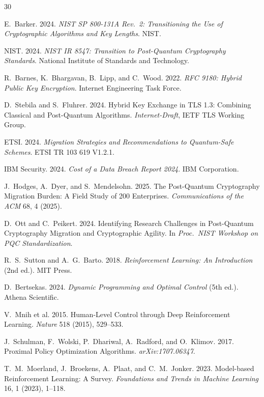 \documentclass[sigconf,nonacm]{acmart}
\begin{document}
\sloppy

\begin{thebibliography}{30}

E.~Barker. 2024. \textit{NIST SP 800-131A Rev.\ 2: Transitioning the
Use of Cryptographic Algorithms and Key Lengths}. NIST.

NIST. 2024. \textit{NIST IR 8547: Transition to Post-Quantum
Cryptography Standards}. National Institute of Standards and Technology.

R.~Barnes, K.~Bhargavan, B.~Lipp, and C.~Wood. 2022. \textit{RFC 9180:
Hybrid Public Key Encryption}. Internet Engineering Task Force.

D.~Stebila and S.~Fluhrer. 2024. Hybrid Key Exchange in TLS 1.3:
Combining Classical and Post-Quantum Algorithms. \textit{Internet-Draft},
IETF TLS Working Group.

ETSI. 2024. \textit{Migration Strategies and Recommendations to
Quantum-Safe Schemes}. ETSI TR 103 619 V1.2.1.

IBM Security. 2024. \textit{Cost of a Data Breach Report 2024}.
IBM Corporation.

J.~Hodges, A.~Dyer, and S.~Mendelsohn. 2025. The Post-Quantum
Cryptography Migration Burden: A Field Study of 200 Enterprises.
\textit{Communications of the ACM} 68, 4 (2025).

D.~Ott and C.~Peikert. 2024. Identifying Research Challenges in
Post-Quantum Cryptography Migration and Cryptographic Agility.
In \textit{Proc.\ NIST Workshop on PQC Standardization}.

R.~S.~Sutton and A.~G.~Barto. 2018. \textit{Reinforcement Learning:
An Introduction} (2nd ed.). MIT Press.

D.~Bertsekas. 2024. \textit{Dynamic Programming and Optimal Control}
(5th ed.). Athena Scientific.

V.~Mnih et al. 2015. Human-Level Control through Deep Reinforcement
Learning. \textit{Nature} 518 (2015), 529--533.

J.~Schulman, F.~Wolski, P.~Dhariwal, A.~Radford, and O.~Klimov. 2017.
Proximal Policy Optimization Algorithms. \textit{arXiv:1707.06347}.

T.~M.~Moerland, J.~Broekens, A.~Plaat, and C.~M.~Jonker. 2023.
Model-based Reinforcement Learning: A Survey. \textit{Foundations
and Trends in Machine Learning} 16, 1 (2023), 1--118.


\end{thebibliography}
\end{document}

